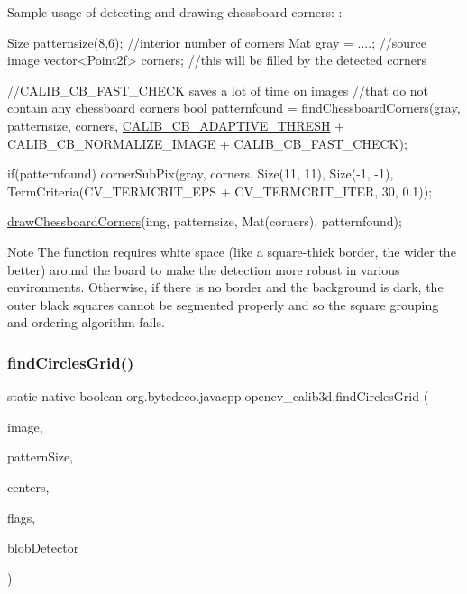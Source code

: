Sample usage of detecting and drawing chessboard corners\+: \+: 
\begin{DoxyPre}
\begin{DoxyCode}
Size patternsize(8,6); \textcolor{comment}{//interior number of corners}
Mat gray = ....; \textcolor{comment}{//source image}
vector<Point2f> corners; \textcolor{comment}{//this will be filled by the detected corners}

\textcolor{comment}{//CALIB\_CB\_FAST\_CHECK saves a lot of time on images}
\textcolor{comment}{//that do not contain any chessboard corners}
\textcolor{keywordtype}{bool} patternfound = \hyperlink{group__calib3d_ga8736b25349ec9178b46c38128bd9d95a}{findChessboardCorners}(gray, patternsize, corners,
        \hyperlink{group__calib3d_gafb359ad540f439e22ec524accd18035a}{CALIB\_CB\_ADAPTIVE\_THRESH} + CALIB\_CB\_NORMALIZE\_IMAGE
        + CALIB\_CB\_FAST\_CHECK);

\textcolor{keywordflow}{if}(patternfound)
  cornerSubPix(gray, corners, Size(11, 11), Size(-1, -1),
    TermCriteria(CV\_TERMCRIT\_EPS + CV\_TERMCRIT\_ITER, 30, 0.1));

\hyperlink{group__calib3d_ga71d497eb4a9eead84d1e4522d54ed580}{drawChessboardCorners}(img, patternsize, Mat(corners), patternfound);
\end{DoxyCode}
 \end{DoxyPre}
 \begin{DoxyNote}{Note}
The function requires white space (like a square-\/thick border, the wider the better) around the board to make the detection more robust in various environments. Otherwise, if there is no border and the background is dark, the outer black squares cannot be segmented properly and so the square grouping and ordering algorithm fails. 
\end{DoxyNote}
\mbox{\label{group__calib3d_ga150470ce16ca1879fd1809729801803b}} 
\subsubsection{\texorpdfstring{find\+Circles\+Grid()}{findCirclesGrid()}}
{\footnotesize\ttfamily static native boolean org.\+bytedeco.\+javacpp.\+opencv\+\_\+calib3d.\+find\+Circles\+Grid (\begin{DoxyParamCaption}\item[{@By\+Val Mat}]{image,  }\item[{@By\+Val Size}]{pattern\+Size,  }\item[{@By\+Val Mat}]{centers,  }\item[{int}]{flags,  }\item[{@Cast(\char`\"{}cv\+::\+Feature\+Detector$\ast$\char`\"{}) @Ptr Feature2D}]{blob\+Detector }\end{DoxyParamCaption})\hspace{0.3cm}{\ttfamily [static]}}



